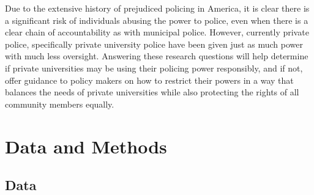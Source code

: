 \documentclass{ucetd}
\begin{document}
Due to the extensive history of prejudiced policing in America, it is
clear there is a significant risk of individuals abusing the power to
police, even when there is a clear chain of accountability as with
municipal police. However, currently private police, specifically
private university police have been given just as much power with much
less oversight. Answering these research questions will help determine
if private universities may be using their policing power responsibly,
and if not, offer guidance to policy makers on how to restrict their
powers in a way that balances the needs of private universities while
also protecting the rights of all community members equally.

\hypertarget{data-and-methods}{%
\chapter{Data and Methods}\label{data-and-methods}}

\hypertarget{data}{%
\section{Data}\label{data}}

\begin{table}

\caption{\label{tab:descr-stats}Categorical Variables}
\centering
{}
\end{table}
\end{document}

